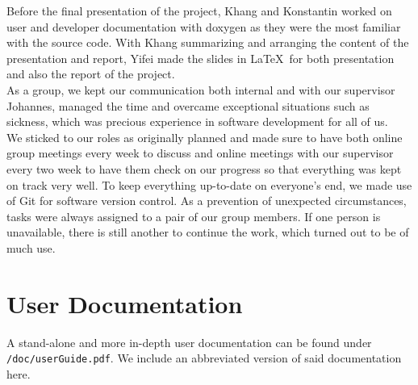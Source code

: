 \documentclass{book}
\begin{document}
\newline
Before the final presentation of the project, Khang and Konstantin worked on user and developer documentation with doxygen as they were the most familiar with the source code. With Khang summarizing and arranging the content of the presentation and report, Yifei made the slides in \LaTeX\ for both presentation and also the report of the project. \\
\newline
As a group, we kept our communication both internal and with our supervisor Johannes, managed the time and overcame exceptional situations such as sickness, which was precious experience in software development for all of us.\\
We sticked to our roles as originally planned and made sure to have both online group meetings every week to discuss and online meetings with our supervisor every two week to have them check on our progress so that everything was kept on track very well. To keep everything up-to-date on everyone's end, we made use of Git for software version control. As a prevention of unexpected circumstances, tasks were always assigned to a pair of our group members. If one person is unavailable, there is still another to continue the work, which turned out to be of much use.





\appendix

\chapter{User Documentation} \label{ch:userdoc}
A stand-alone and more in-depth user documentation can be found under \\ \texttt{/doc/userGuide.pdf}. We include an abbreviated version of said documentation here.
\end{document}
